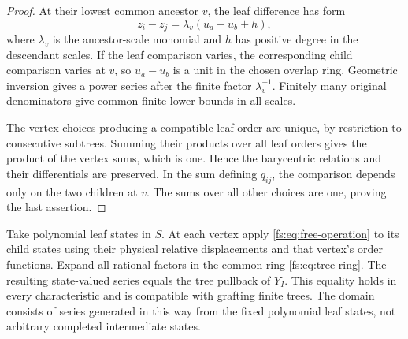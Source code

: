 \begin{proof}
At their lowest common ancestor \(v\), the leaf difference has form
\[
 z_i-z_j=\lambda_v(u_a-u_b+h),
\]
where \(\lambda_v\) is the ancestor-scale monomial and \(h\)
has positive degree in the descendant scales.  If the leaf comparison
varies, the corresponding child comparison varies at \(v\), so
\(u_a-u_b\) is a unit in the chosen overlap ring.  Geometric
inversion gives a power series after the finite factor
\(\lambda_v^{-1}\).  Finitely many original denominators give
common finite lower bounds in all scales.

The vertex choices producing a compatible leaf order are unique,
by restriction to consecutive subtrees.  Summing their products
over all leaf orders gives the product of the vertex sums, which
is one.  Hence the barycentric relations and their differentials
are preserved.  In the sum defining \(q_{ij}\), the comparison
depends only on the two children at \(v\).  The sums over all
other choices are one, proving the last assertion.
\end{proof}

\begin{theorem}\label{fs:thm:tree-insertion}
Take polynomial leaf states in \(S\).  At each vertex apply
\eqref{fs:eq:free-operation} to its child states using their physical
relative displacements and that vertex's order functions.  Expand
all rational factors in the common ring \eqref{fs:eq:tree-ring}.
The resulting state-valued series equals the tree pullback of
\(Y_I\).  This equality holds in every characteristic and is
compatible with grafting finite trees.
The domain consists of series generated in this way from the fixed
polynomial leaf states, not arbitrary completed intermediate states.
\end{theorem}


